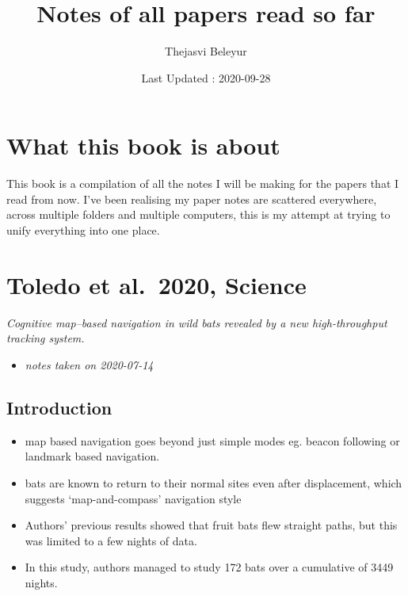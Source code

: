 \documentclass[
]{book}
\title{Notes of all papers read so far}
\author{Thejasvi Beleyur}
\date{Last Updated : 2020-09-28}
\providecommand{\tightlist}{%
  \setlength{\itemsep}{0pt}\setlength{\parskip}{0pt}}
\begin{document}
\maketitle

{
\setcounter{tocdepth}{1}
\tableofcontents
}
\hypertarget{what-this-book-is-about}{%
\chapter*{What this book is about}\label{what-this-book-is-about}}

This book is a compilation of all the notes I will be making for the papers that I read from now.
I've been realising my paper notes are scattered everywhere, across multiple folders and multiple computers,
this is my attempt at trying to unify everything into one place.

\hypertarget{toledo-et-al.-2020-science}{%
\chapter{Toledo et al.~2020, Science}\label{toledo-et-al.-2020-science}}


\emph{Cognitive map--based navigation in wild bats revealed by a new high-throughput tracking system.} \citep{toledo2020cognitive}

\begin{itemize}
\tightlist
\item
  \emph{notes taken on 2020-07-14}
\end{itemize}

\hypertarget{introduction}{%
\section{Introduction}\label{introduction}}

\begin{itemize}
\tightlist
\item
  map based navigation goes beyond just simple modes eg. beacon following or landmark based navigation.
\item
  bats are known to return to their normal sites even after displacement, which suggests `map-and-compass' navigation style
\item
  Authors' previous results showed that fruit bats flew straight paths, but this was limited to a few nights of data.
\item
  In this study, authors managed to study 172 bats over a cumulative of 3449 nights.
\end{itemize}
\end{document}
